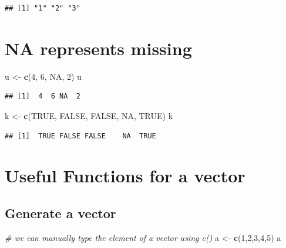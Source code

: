 \documentclass[]{book}
\newenvironment{Shaded}{\begin{snugshade}}{\end{snugshade}}
\newcommand{\CommentTok}[1]{\textcolor[rgb]{0.56,0.35,0.01}{\textit{#1}}}
\newcommand{\DecValTok}[1]{\textcolor[rgb]{0.00,0.00,0.81}{#1}}
\newcommand{\KeywordTok}[1]{\textcolor[rgb]{0.13,0.29,0.53}{\textbf{#1}}}
\newcommand{\NormalTok}[1]{#1}
\newcommand{\OtherTok}[1]{\textcolor[rgb]{0.56,0.35,0.01}{#1}}
\newcommand{\StringTok}[1]{\textcolor[rgb]{0.31,0.60,0.02}{#1}}
\begin{document}
\begin{verbatim}
## [1] "1" "2" "3"
\end{verbatim}

\hypertarget{na-represents-missing}{%
\section{NA represents missing}\label{na-represents-missing}}

\begin{Shaded}
\begin{Highlighting}[]
\NormalTok{u <-}\StringTok{ }\KeywordTok{c}\NormalTok{(}\DecValTok{4}\NormalTok{, }\DecValTok{6}\NormalTok{, }\OtherTok{NA}\NormalTok{, }\DecValTok{2}\NormalTok{)}
\NormalTok{u}
\end{Highlighting}
\end{Shaded}

\begin{verbatim}
## [1]  4  6 NA  2
\end{verbatim}

\begin{Shaded}
\begin{Highlighting}[]
\NormalTok{k <-}\StringTok{ }\KeywordTok{c}\NormalTok{(}\OtherTok{TRUE}\NormalTok{, }\OtherTok{FALSE}\NormalTok{, }\OtherTok{FALSE}\NormalTok{, }\OtherTok{NA}\NormalTok{, }\OtherTok{TRUE}\NormalTok{)}
\NormalTok{k}
\end{Highlighting}
\end{Shaded}

\begin{verbatim}
## [1]  TRUE FALSE FALSE    NA  TRUE
\end{verbatim}

\hypertarget{useful-functions-for-a-vector}{%
\section{Useful Functions for a vector}\label{useful-functions-for-a-vector}}

\hypertarget{generate-a-vector}{%
\subsection{Generate a vector}\label{generate-a-vector}}

\begin{Shaded}
\begin{Highlighting}[]
\CommentTok{# we can manually type the element of a vector using c()}
\NormalTok{a <-}\StringTok{ }\KeywordTok{c}\NormalTok{(}\DecValTok{1}\NormalTok{,}\DecValTok{2}\NormalTok{,}\DecValTok{3}\NormalTok{,}\DecValTok{4}\NormalTok{,}\DecValTok{5}\NormalTok{)}
\NormalTok{a}
\end{Highlighting}
\end{Shaded}
\end{document}
